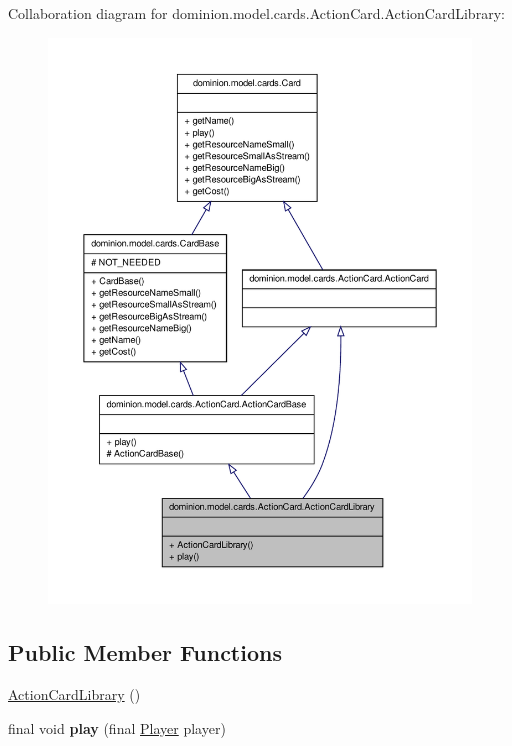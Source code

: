 \-Collaboration diagram for dominion.\-model.\-cards.\-Action\-Card.\-Action\-Card\-Library\-:
\nopagebreak
\begin{figure}[H]
\begin{center}
\leavevmode
\includegraphics[width=350pt]{classdominion_1_1model_1_1cards_1_1ActionCard_1_1ActionCardLibrary__coll__graph}
\end{center}
\end{figure}
\subsection*{\-Public \-Member \-Functions}
\begin{DoxyCompactItemize}
\item 
\hyperlink{classdominion_1_1model_1_1cards_1_1ActionCard_1_1ActionCardLibrary_aa1ba551c57c2382a0c5f360dbc42ad72}{\-Action\-Card\-Library} ()
\item 
\hypertarget{classdominion_1_1model_1_1cards_1_1ActionCard_1_1ActionCardLibrary_afd48cf6988569079d68d1c8e7df5182e}{final void {\bfseries play} (final \hyperlink{interfacedominion_1_1model_1_1Player}{\-Player} player)}\label{classdominion_1_1model_1_1cards_1_1ActionCard_1_1ActionCardLibrary_afd48cf6988569079d68d1c8e7df5182e}

\end{DoxyCompactItemize}


